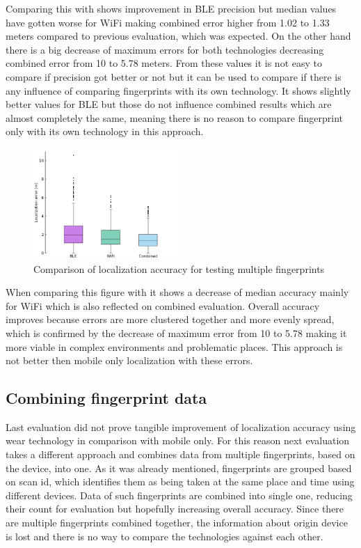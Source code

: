 Comparing this  with  shows improvement in BLE precision but median values have gotten worse for WiFi making combined error higher from 1.02 to 1.33 meters compared to previous evaluation, which was expected. On the other hand there is a big decrease of maximum errors for both technologies decreasing combined error from 10 to 5.78 meters. From these values it is not easy to compare if precision got better or not but it can be used to compare if there is any influence of comparing fingerprints with its own technology. It shows slightly better values for BLE but those do not influence combined results which are almost completely the same, meaning there is no reason to compare fingerprint only with its own technology in this approach.

\begin{figure}[h!]
	\begin{centering}
		\includegraphics[width=0.5\textwidth]{img/wknn_errors_multiple}
		\par\end{centering}
	\caption{Comparison of localization accuracy for testing multiple fingerprints}
	\label{fig07c06}
\end{figure}

When comparing this figure with  it shows a decrease of median accuracy mainly for WiFi which is also reflected on combined evaluation. Overall accuracy improves because errors are more clustered together and more evenly spread, which is confirmed by the decrease of maximum error from 10 to 5.78 making it more viable in complex environments and problematic places. This approach is not better then mobile only localization with these errors.

\subsection{Combining fingerprint data}\label{sec:CombiningFingerprintData}
Last evaluation did not prove tangible improvement of localization accuracy using wear technology in comparison with mobile only. For this reason next evaluation takes a different approach and combines data from multiple fingerprints, based on the device, into one. As it was already mentioned, fingerprints are grouped based on scan id, which identifies them as being taken at the same place and time using different devices. Data of such fingerprints are combined into single one, reducing their count for evaluation but hopefully increasing overall accuracy. Since there are multiple fingerprints combined together, the information about origin device is lost and there is no way to compare the technologies against each other.

